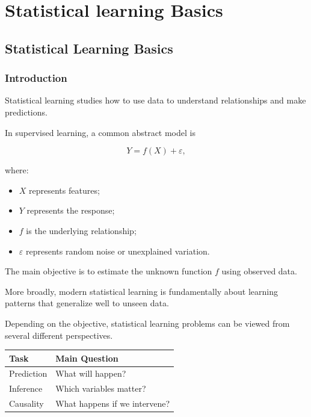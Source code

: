 \documentclass[
  letterpaper,
  DIV=11,
  numbers=noendperiod]{scrreprt}
\newcounter{none} %
\providecommand{\tightlist}{%
  \setlength{\itemsep}{0pt}\setlength{\parskip}{0pt}}
\theoremstyle{definition}
\theoremstyle{definition}
\theoremstyle{plain}
\theoremstyle{plain}
\theoremstyle{remark}
\begin{document}
\part{Statistical learning Basics}

\chapter{Statistical Learning
Basics}\label{statistical-learning-basics-1}

\section{Introduction}\label{introduction}

Statistical learning studies how to use data to understand relationships
and make predictions.

In supervised learning, a common abstract model is

\[
Y = f(X) + \varepsilon,
\]

where:

\begin{itemize}
\tightlist
\item
  \(X\) represents features;
\item
  \(Y\) represents the response;
\item
  \(f\) is the underlying relationship;
\item
  \(\varepsilon\) represents random noise or unexplained variation.
\end{itemize}

The main objective is to estimate the unknown function \(f\) using
observed data.

More broadly, modern statistical learning is fundamentally about
learning patterns that generalize well to unseen data.

Depending on the objective, statistical learning problems can be viewed
from several different perspectives.

{\def\LTcaptype{none} %
\begin{longtable}[]{@{}ll@{}}
\toprule\noalign{}
Task & Main Question \\
\midrule\noalign{}
\endhead
\bottomrule\noalign{}
\endlastfoot
Prediction & What will happen? \\
Inference & Which variables matter? \\
Causality & What happens if we intervene? \\
\end{longtable}
}
\end{document}
